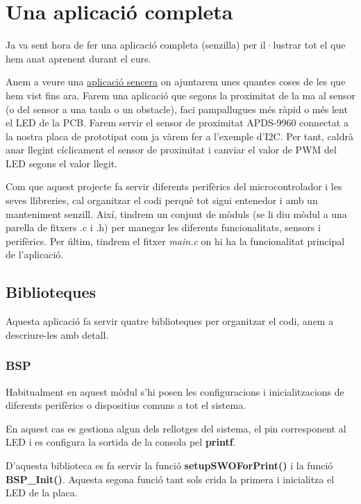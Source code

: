\chapter{Una aplicació completa}
\label{ch:aplicaciosenzilla}
Ja va sent hora de fer una aplicació completa (senzilla) per il·lustrar tot el que hem anat aprenent durant el curs.

Anem a veure una \href{https://github.com/mariusmm/cursembedded/tree/master/Simplicity/Barebone_App_1}{aplicació sencera} on ajuntarem unes quantes coses de les que hem vist fins ara. Farem una aplicació que segons la proximitat de la ma al sensor (o del sensor a una taula o un obstacle), faci pampallugues més ràpid o més lent el LED de la PCB. Farem servir el sensor de proximitat APDS-9960 connectat a la nostra placa de prototipat com ja vàrem fer a l'exemple d'I2C. Per tant, caldrà anar llegint cíclicament el sensor de proximitat i canviar el valor de \gls{PWM} del LED segons el valor llegit.

Com que aquest projecte fa servir diferents perifèrics del microcontrolador i les seves llibreries, cal organitzar el codi perquè tot sigui entenedor i amb un manteniment senzill. Així, tindrem un conjunt de mòduls (se li diu mòdul a una parella de fitxers .c i .h) per manegar les diferents funcionalitats, sensors i perifèrics. Per últim, tindrem el fitxer {\em main.c} on hi ha la funcionalitat principal de l'aplicació.

\section{Biblioteques}
Aquesta aplicació fa servir quatre biblioteques per organitzar el codi, anem a descriure-les amb detall.

\subsection{BSP}
Habitualment en aquest mòdul s'hi posen les configuracions i inicialitzacions de diferents perifèrics o dispositius comuns a tot el sistema.

En aquest cas es gestiona algun dels rellotges del sistema, el pin corresponent al LED i es configura la sortida de la consola pel {\bf printf}.

D'aquesta biblioteca es fa servir la funció {\bf setupSWOForPrint()} i la funció {\bf BSP\_Init()}. Aquesta segona funció tant sols crida la primera i inicialitza el LED de la placa.

